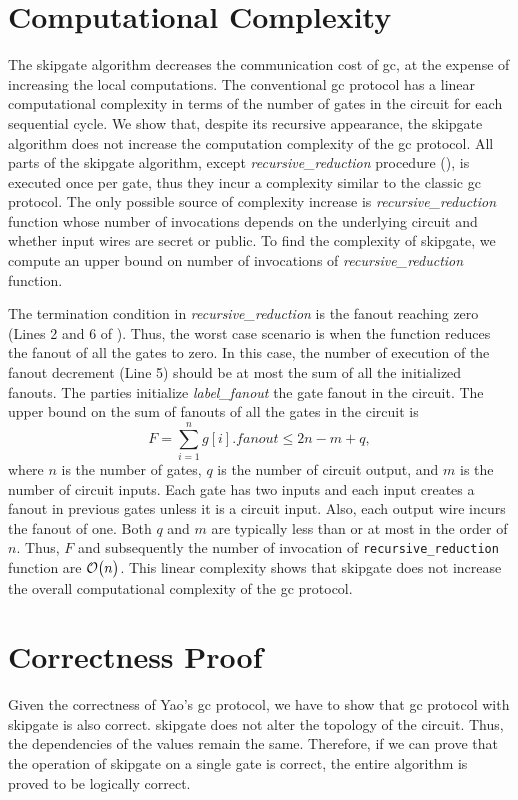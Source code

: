 \section{Computational Complexity}\label{sec:skipgate-complex}
The \gls{skipgate} algorithm decreases the communication cost of \acrshort{gc}, at the expense of increasing the local computations.
The conventional \acrshort{gc} protocol has a linear computational complexity in terms of the number of gates in the circuit for each sequential cycle.
We show that, despite its recursive appearance, the \gls{skipgate} algorithm does not increase the computation complexity of the \acrshort{gc} protocol.
All parts of the \gls{skipgate} algorithm, except \textit{recursive\_reduction} procedure (), is executed once per gate, thus they incur a complexity similar to the classic \acrshort{gc} protocol.
The only possible source of complexity increase is \textit{recursive\_reduction} function whose number of invocations depends on the underlying circuit and whether input wires are secret or public.
To find the complexity of \gls{skipgate}, we compute an upper bound on number of invocations of \textit{recursive\_reduction} function.

The termination condition in \textit{recursive\_reduction} is the fanout reaching zero (Lines 2 and 6 of ).
Thus, the worst case scenario is when the function reduces the fanout of all the gates to zero.
In this case, the number of execution of the fanout decrement (Line 5) should be at most the sum of all the initialized fanouts.
The parties initialize \textit{label\_fanout} the gate fanout in the circuit.
The upper bound on the sum of fanouts of all the gates in the circuit is $$F = \sum_{i=1}^{n} g[i].fanout \le 2n - m + q,$$ where $n$ is the number of gates, $q$ is the number of circuit output, and $m$ is the number of circuit inputs.
Each gate has two inputs and each input creates a fanout in previous gates unless it is a circuit input.
Also, each output wire incurs the fanout of one.
Both $q$ and $m$ are typically less than or at most in the order of $n$.
Thus, $F$ and subsequently the number of invocation of \texttt{recursive\_reduction} function are $\mathcal{O}\bigl(n\bigr)$.
This linear complexity shows that \gls{skipgate} does not increase the overall computational complexity of the \acrshort{gc} protocol.

\section{Correctness Proof}\label{sec:skipgate-correct}
Given the correctness of Yao's \acrshort{gc} protocol, we have to show that \acrshort{gc} protocol with \gls{skipgate} is also correct.
\gls{skipgate} does not alter the topology of the circuit.
Thus, the dependencies of the values remain the same.
Therefore, if we can prove that the operation of \gls{skipgate} on a single gate is correct, the entire algorithm is proved to be logically correct.

